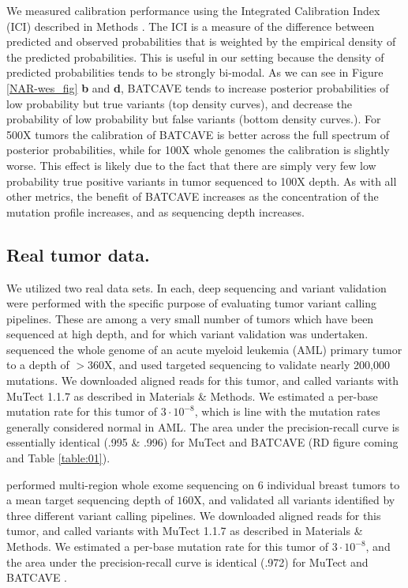 \documentclass[a4,center,fleqn]{NAR}
\newcommand{\batcave}{BATCAVE }
\begin{document}
We measured calibration performance using the Integrated Calibration Index (ICI) described in Methods \citep{Austin2019}.
The ICI is a measure of the difference between predicted and observed probabilities that is weighted by the empirical density of the predicted probabilities.
This is useful in our setting because the density of predicted probabilities tends to be strongly bi-modal.
As we can see in Figure \ref{NAR-wes_fig} \textbf{b} and \textbf{d}, \batcave tends to increase posterior probabilities of low probability but true variants (top density curves), and decrease the probability of low probability but false variants (bottom density curves.).
For 500X tumors the calibration of \batcave is better across the full spectrum of posterior probabilities, while for 100X whole genomes the calibration is slightly worse.
This effect is likely due to the fact that there are simply very few low probability true positive variants in tumor sequenced to 100X depth.
As with all other metrics, the benefit of \batcave increases as the concentration of the mutation profile increases, and as sequencing depth increases.


\subsection{Real tumor data.}
We utilized two real data sets.
In each, deep sequencing and variant validation were performed with the specific purpose of evaluating tumor variant calling pipelines.
These are among a very small number of tumors which have been sequenced at high depth, and for which variant validation was undertaken.
\citet{Griffith2015} sequenced the whole genome of an acute myeloid leukemia (AML) primary tumor to a depth of $>360\mathrm{X}$, and used targeted sequencing to validate nearly 200,000 mutations.
We downloaded aligned reads for this tumor, and called variants with MuTect 1.1.7 as described in Materials \& Methods.
We estimated a per-base mutation rate for this tumor of $3\cdot10^{-8}$, which is line with the mutation rates generally considered normal in AML.
The area under the precision-recall curve is essentially identical (.995 \& .996) for MuTect and \batcave (RD figure coming and Table \ref{table:01}).

\citet{Shi2018} performed multi-region whole exome sequencing on 6 individual breast tumors to a mean target sequencing depth of $160\mathrm{X}$, and validated all variants identified by three different variant calling pipelines.
We downloaded aligned reads for this tumor, and called variants with MuTect 1.1.7 as described in Materials \& Methods.
We estimated a per-base mutation rate for this tumor of $3\cdot10^{-8}$, and the area under the precision-recall curve is identical (.972) for MuTect and \batcave.
\end{document}
